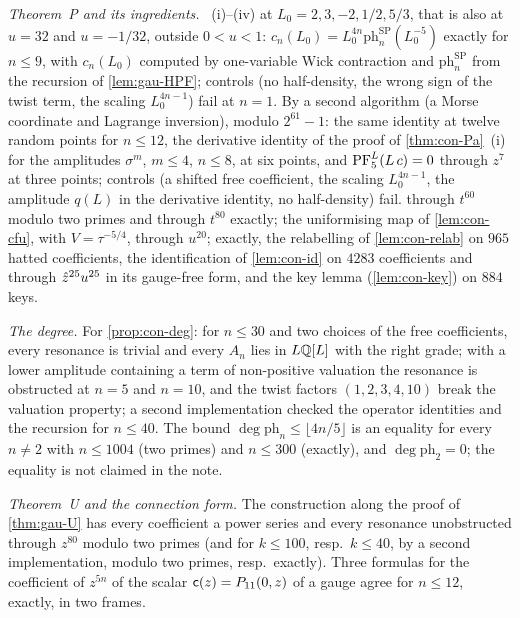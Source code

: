 \emph{Theorem~P and its ingredients.} ~(i)--(iv) at $L_0=2,3,-2,1/2,5/3$, that is also at $u=32$ and $u=-1/32$, outside $0<u<1$: $c_n(L_0)=L_0^{4n}\mathrm{ph}^{\mathrm{SP}}_n(L_0^{-5})$ exactly for $n\leq 9$, with $c_n(L_0)$ computed by one-variable Wick contraction and $\mathrm{ph}^{\mathrm{SP}}_n$ from the recursion of \cref{lem:gau-HPF}; controls (no half-density, the wrong sign of the twist term, the scaling $L_0^{4n-1}$) fail at $n=1$. By a second algorithm (a Morse coordinate and Lagrange inversion), modulo $2^{61}-1$: the same identity at twelve random points for $n\leq 12$, the derivative identity of the proof of \cref{thm:con-Pa}~(i) for the amplitudes $\sigma^m$, $m\leq 4$, $n\leq 8$, at six points, and $\mathrm{PF}_{5}^{L}(L\,c)=0$ through $z^7$ at three points; controls (a shifted free coefficient, the scaling $L_0^{4n-1}$, the amplitude $q(L)$ in the derivative identity, no half-density) fail.  through $t^{60}$ modulo two primes and through $t^{80}$ exactly; the uniformising map of \cref{lem:con-cfu}, with $V=\tau^{-5/4}$, through $u^{20}$; exactly, the relabelling of \cref{lem:con-relab} on $965$ hatted coefficients, the identification of \cref{lem:con-id} on $4283$ coefficients and through $\hat{z}^{25}u^{25}$ in its gauge-free form, and the key lemma (\cref{lem:con-key}) on $884$ keys.

\emph{The degree.} For \cref{prop:con-deg}: for $n\leq 30$ and two choices of the free coefficients, every resonance is trivial and every $A_n$ lies in $L\mathbb{Q}[L]$ with the right grade; with a lower amplitude containing a term of non-positive valuation the resonance is obstructed at $n=5$ and $n=10$, and the twist factors $(1,2,3,4,10)$ break the valuation property; a second implementation checked the operator identities and the recursion for $n\leq 40$. The bound $\deg\mathrm{ph}_n\leq\lfloor 4n/5\rfloor$ is an equality for every $n\neq 2$ with $n\leq 1004$ (two primes) and $n\leq 300$ (exactly), and $\deg\mathrm{ph}_2=0$; the equality is not claimed in the note.

\emph{Theorem~U and the connection form.} The construction along the proof of \cref{thm:gau-U} has every coefficient a power series and every resonance unobstructed through $z^{80}$ modulo two primes (and for $k\leq 100$, resp.\ $k\leq 40$, by a second implementation, modulo two primes, resp.\ exactly). Three formulas for the coefficient of $z^{5n}$ of the scalar $\mathsf{c}(z)=P_{11}(0,z)$ of a gauge agree for $n\leq 12$, exactly, in two frames.

